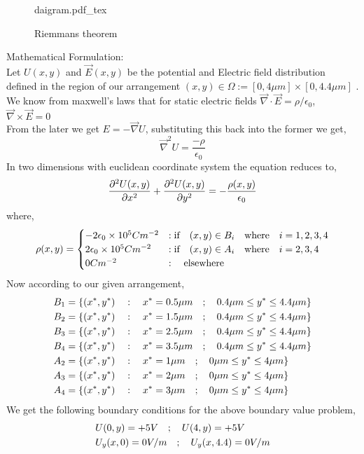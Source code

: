 \begin{figure}[h]
    \centering
    \def\svgwidth{0.6\textwidth}
    {daigram.pdf_tex}
    \caption{Riemmans theorem}
    \label{fig:riemmans-theorem}
\end{figure}

Mathematical Formulation:\\
Let $U(x,y)$ and $\vec{E}(x,y)$ be the potential and Electric field distribution defined in the region of our arrangement $(x,y) \in \Omega := [0,4\mu m]\times[0,4.4\mu m]$ .\\
We know from maxwell's laws that for static electric fields $\vec{\nabla} \cdot \vec{E} = \rho / \epsilon_0 $, $\vec{\nabla} \times \vec{E} = 0$
\\
From the later we get $E=-\vec{\nabla}U$, substituting this back into the former we get,
\begin{equation*}
    \vec{\nabla}^2 U = \frac{-\rho}{\epsilon_0}  
\end{equation*}
In two dimensions with euclidean coordinate system the equation reduces to, 
\begin{equation}
    \frac{\partial^2U(x,y) }{\partial x^{2}} + \frac{\partial^2U(x,y) }{\partial y^{2}}= -\frac{\rho(x,y)}{\epsilon_0} \\
\end{equation}
where,
\begin{equation}
\rho(x,y) =  \begin{cases}
    -2\epsilon_0 \times 10^5 C m^{-2} & :\text{if} \hspace{0.35cm} (x,y) \in B_i \hspace{0.35cm} \text{where} \hspace{0.35cm} i = 1,2,3,4 \\
    2\epsilon_0 \times 10^5 C m^{-2} & :\text{if} \hspace{0.35cm} (x,y) \in A_i \hspace{0.35cm} \text{where} \hspace{0.35cm} i = 2,3,4  \\
    0 C m^{-2} & : \hspace{0.35cm} \text{elsewhere}
\end{cases}  
\end{equation}
Now according to our given arrangement,
\begin{align}
    B_1 &= \{ (x^*,y^*) \hspace{0.35cm} : \hspace{0.35cm} x^*= 0.5\mu m \hspace{0.35cm};\hspace{0.35cm} 0.4\mu m \leq y^* \leq 4.4\mu m \} \\
    B_2 &= \{ (x^*,y^*) \hspace{0.35cm} : \hspace{0.35cm} x^*= 1.5\mu m \hspace{0.35cm};\hspace{0.35cm} 0.4\mu m \leq y^* \leq 4.4\mu m \} \\
    B_3 &= \{ (x^*,y^*) \hspace{0.35cm} : \hspace{0.35cm} x^*= 2.5\mu m \hspace{0.35cm};\hspace{0.35cm} 0.4\mu m \leq y^* \leq 4.4\mu m \} \\
    B_4 &= \{ (x^*,y^*) \hspace{0.35cm} : \hspace{0.35cm} x^*= 3.5\mu m \hspace{0.35cm};\hspace{0.35cm} 0.4\mu m \leq y^* \leq 4.4\mu m \} \\
    A_2 &= \{ (x^*,y^*) \hspace{0.35cm} : \hspace{0.35cm} x^*= 1\mu m \hspace{0.35cm};\hspace{0.35cm} 0\mu m \leq y^* \leq 4\mu m \} \\
    A_3 &= \{ (x^*,y^*) \hspace{0.35cm} : \hspace{0.35cm} x^*= 2\mu m \hspace{0.35cm};\hspace{0.35cm} 0\mu m \leq y^* \leq 4\mu m \} \\
    A_4 &= \{ (x^*,y^*) \hspace{0.35cm} : \hspace{0.35cm} x^*= 3\mu m \hspace{0.35cm};\hspace{0.35cm} 0\mu m \leq y^* \leq 4\mu m \} 
\end{align}
We get the following boundary conditions for the above boundary value problem,
\begin{align}
    & U(0,y) = +5 V \hspace{0.35cm}; \hspace{0.35cm} U(4,y) = +5 V \\ 
    & U_y(x,0) = 0V/m \hspace{0.35cm}; \hspace{0.35cm} U_y(x,4.4) = 0V/m 
\end{align}

